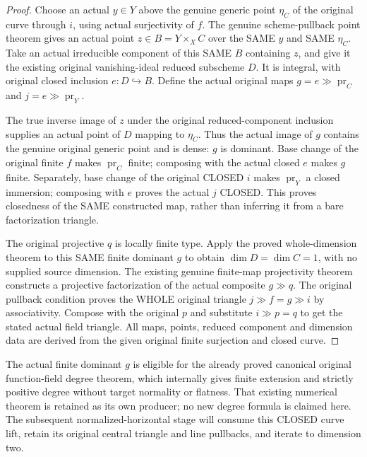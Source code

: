 \begin{proof}
Choose an actual $y\in Y$ above the genuine generic point $\eta_C$
of the original curve through $i$, using actual surjectivity of $f$.
The genuine scheme-pullback point theorem gives an actual point
$z\in B=Y\times_X C$ over the SAME $y$ and SAME $\eta_C$.
Take an actual irreducible component of this SAME $B$ containing $z$,
and give it the existing original vanishing-ideal reduced subscheme
$D$. It is integral, with original closed inclusion $e:D\hookrightarrow B$.
Define the actual original maps
$g=e\gg\operatorname{pr}_C$ and $j=e\gg\operatorname{pr}_Y$.

The true inverse image of $z$ under the original reduced-component
inclusion supplies an actual point of $D$ mapping to $\eta_C$.
Thus the actual image of $g$ contains the genuine original generic
point and is dense: $g$ is dominant. Base change of the original
finite $f$ makes $\operatorname{pr}_C$ finite; composing with the
actual closed $e$ makes $g$ finite. Separately, base change of the
original CLOSED $i$ makes $\operatorname{pr}_Y$ a closed immersion;
composing with $e$ proves the actual $j$ CLOSED. This proves closedness
of the SAME constructed map, rather than inferring it from a bare
factorization triangle.

The original projective $q$ is locally finite type. Apply the proved
whole-dimension theorem to this SAME finite dominant $g$ to obtain
$\dim D=\dim C=1$, with no supplied source dimension. The existing
genuine finite-map projectivity theorem constructs a projective
factorization of the actual composite $g\gg q$. The original
pullback condition proves the WHOLE original triangle
$j\gg f=g\gg i$ by associativity. Compose with the original $p$
and substitute $i\gg p=q$ to get the stated actual field triangle.
All maps, points, reduced component and dimension data are derived
from the given original finite surjection and closed curve.
\end{proof}

The actual finite dominant $g$ is eligible for the already proved
canonical original function-field degree theorem, which internally
gives finite extension and strictly positive degree without target
normality or flatness. That existing numerical theorem is retained
as its own producer; no new degree formula is claimed here. The
subsequent normalized-horizontal stage will consume this CLOSED curve
lift, retain its original central triangle and line pullbacks, and
iterate to dimension two.

